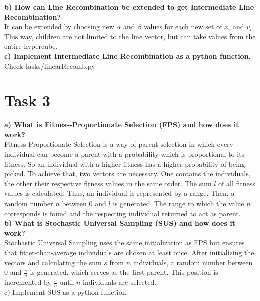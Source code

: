 \documentclass[12pt,letterpaper]{article}
\begin{document}
\textbf{b)  How can Line Recombination be extended to get Intermediate Line Recombination?} \\
It can be extended by choosing new $\alpha$ and $\beta$ values for each new set of $x_{i}$ and $v_{i}$. This way, children are not limited to the line vector, but can take values from the entire hypercube.\\

\textbf{c)  Implement Intermediate Line Recombination as a python function.}\\
Check tasks/linearRecomb.py

\section*{Task 3}
\textbf{a)  What is Fitness-Proportionate Selection (FPS) and how does it work?} \\
Fitness Proportionate Selection is a way of parent selection in which every individual can become a parent with a probability which is proportional to its fitness. So an individual with a higher fitness has a higher probability of being picked. To achieve that, two vectors are necessary. One contains the individuals, the other their respective fitness values in the same order. The sum $l$ of all fitness values is calculated. Thus, an individual is represented by a range. Then, a random number $n$ between 0 and $l$ is generated. The range to which the value $n$ corresponds is found and the respecting individual returned to act as parent.\\

\textbf{b)  What is Stochastic Universal Sampling (SUS) and how does it work?} \\
Stochastic Universal Sampling uses the same initialization as FPS but ensures that fitter-than-average individuals are chosen at least once. After initializing the vectors and calculating the sum $s$ from $n$ individuals, a random number between $0$ and $\frac{s}{n}$ is generated, which serves as the first parent. This position is incremented by $\frac{s}{n}$ until $n$ individuals are selected.\\

c)  Implement SUS as a python function.
\end{document}
